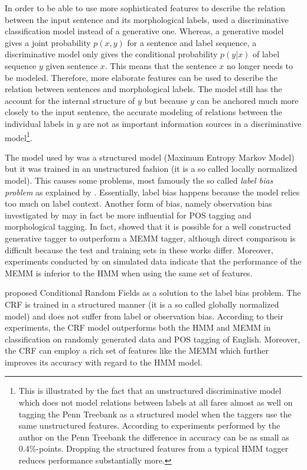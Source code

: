 In order to be able to use more sophisticated features to describe the
relation between the input sentence and its morphological labels,
\cite{Ratnaparkhi1997} used a discriminative classification model
instead of a generative one. Whereas, a generative model gives a joint
probability $p(x,y)$ for a sentence and label sequence, a
discriminative model only gives the conditional probability $p(y|x)$
of label sequence $y$ given sentence $x$. This means that the sentence
$x$ no longer needs to be modeled. Therefore, more elaborate features
can be used to describe the relation between sentences and
morphological labels. The model still has the account for the internal
structure of $y$ but because $y$ can be anchored much more closely to
the input sentence, the accurate modeling of relations between the
individual labels in $y$ are not as important information sources in a
discriminative model\footnote{This is illustrated by the fact that an
  unstructured discriminative model which does not model relations
  between labels at all fares almost as well on tagging the Penn
  Treebank as a structured model when the taggers use the same
  unstructured features. According to experiments performed by the
  author on the Penn Treebank the difference in accuracy can be as
  small as 0.4\%-points. Dropping the structured features from a
  typical HMM tagger reduces performance substantially more.}.

The model used by \cite{Ratnaparkhi1997} was a structured model
(Maximum Entropy Markov Model) but it was trained in an unstructured
fashion (it is a so called locally normalized model). This causes some
problems, most famously the so called {\it label bias problem} as
explained by \cite{Lafferty2001}. Essentially, label bias happens
because the model relies too much on label context. Another form of
bias, namely observation bias investigated by \cite{Klein2002} may in
fact be more influential for POS tagging and morphological tagging. In
fact, \cite{Brants2000} showed that it is possible for a well
constructed generative tagger to outperform a MEMM tagger, although
direct comparison is difficult because the test and training sets in
these works differ. Moreover, experiments conducted by
\cite{Lafferty2001} on simulated data indicate that the performance of
the MEMM is inferior to the HMM when using the same set of features.

\cite{Lafferty2001} proposed Conditional Random Fields as a solution
to the label bias problem. The CRF is trained in a structured manner
(it is a so called globally normalized model) and does not suffer from
label or observation bias. According to their experiments, the CRF
model outperforms both the HMM and MEMM in classification on randomly
generated data and POS tagging of English. Moreover, the CRF can
employ a rich set of features like the MEMM which further improves its
accuracy with regard to the HMM model.

